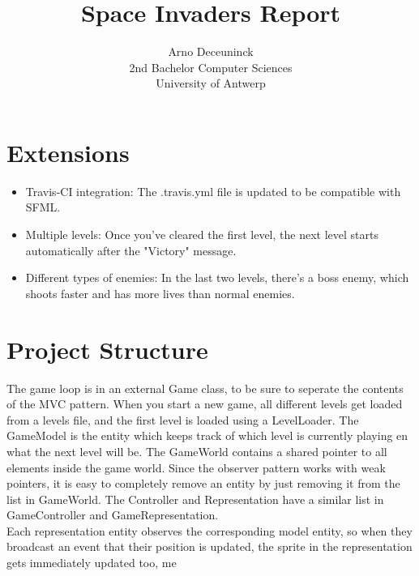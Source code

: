 \documentclass{article}
\title{Space Invaders Report}
\author{Arno Deceuninck\\ 2nd Bachelor Computer Sciences \\ University of Antwerp}
\begin{document}
    \maketitle

    \section{Extensions}
    \begin{itemize}
        \item Travis-CI integration: The .travis.yml file is updated to be compatible with SFML.
        \item Multiple levels: Once you've cleared the first level, the next level starts automatically after the "Victory" message.
        \item Different types of enemies: In the last two levels, there's a boss enemy, which shoots faster and has more lives than normal enemies.
    \end{itemize}
    \section{Project Structure}
    The game loop is in an external Game class, to be sure to seperate the contents of the MVC pattern. When you start a new game, all different levels get loaded from a levels file, and the first level is loaded using a LevelLoader. The GameModel is the entity which keeps track of which level is currently playing en what the next level will be. The GameWorld contains a shared pointer to all elements inside the game world. Since the observer pattern works with weak pointers, it is easy to completely remove an entity by just removing it from the list in GameWorld. The Controller and Representation have a similar list in GameController and GameRepresentation. \\
    Each representation entity observes the corresponding model entity, so when they broadcast an event that their position is updated, the sprite in the representation gets immediately updated too, me
\end{document}

